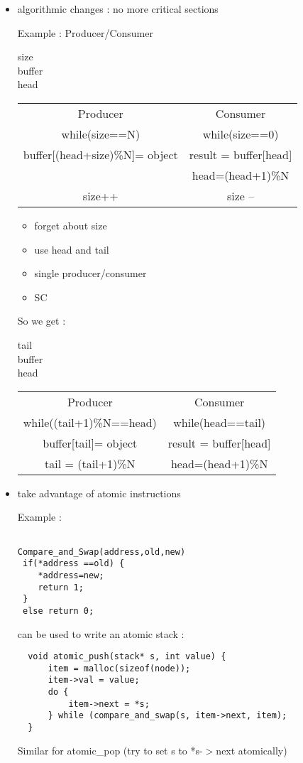 \documentclass[a4paper,10pt]{article}
\begin{document}
\begin{itemize}
  \item algorithmic changes : no more critical sections
  
  Example : Producer/Consumer
  
  \begin{center}
size\\buffer\\head

      \begin{tabular}{c|c}
        Producer & Consumer\\
        while(size==N) {} & while(size==0) {}\\
        buffer[(head+size)\%N]= object & result = buffer[head]\\
         & head=(head+1)\%N \\        
        size++ & size -- \\
      \end{tabular}
    \end{center}
  
  
  \begin{itemize}
    \item forget about size
    \item use head and tail
    \item single producer/consumer
    \item SC
  \end{itemize}

So we get :
\begin{center}
tail\\buffer\\head

      \begin{tabular}{c|c}
        Producer & Consumer\\
        while((tail+1)\%N==head) {} & while(head==tail) {}\\
        buffer[tail]= object & result = buffer[head]\\
        tail = (tail+1)\%N & head=(head+1)\%N \\        
      \end{tabular}
    \end{center}    

\item take advantage of atomic instructions

Example : 
\begin{verbatim}

Compare_and_Swap(address,old,new)
 if(*address ==old) {
    *address=new;
    return 1;
 }
 else return 0;
\end{verbatim}
can be used to write an atomic stack :

\begin{verbatim}
  void atomic_push(stack* s, int value) {
      item = malloc(sizeof(node));
      item->val = value;
      do {
          item->next = *s;
      } while (compare_and_swap(s, item->next, item);
  }
\end{verbatim}

Similar for atomic\_pop (try to set s to *s-$>$next atomically)

\end{itemize}
\end{document}
